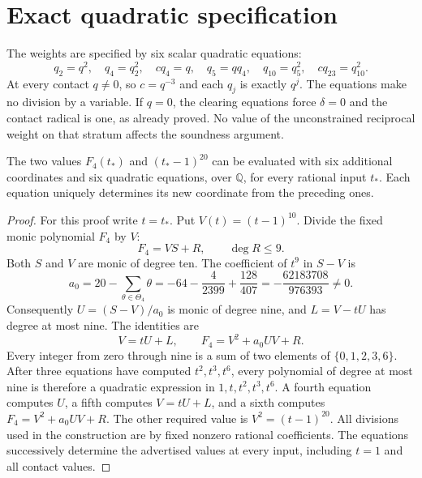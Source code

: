 \documentclass[11pt,a4paper]{article}
\newcommand{\Q}{\mathbb Q}\newcommand{\Z}{\mathbb Z}\newcommand{\HH}{\mathcal H}
\begin{document}
\section{Exact quadratic specification}
The weights are specified by six scalar quadratic equations:
\[
 q_2=q^2,\quad q_4=q_2^2,\quad c q_4=q,\quad
 q_5=qq_4,\quad q_{10}=q_5^2,\quad c q_{23}=q_{10}^2.
\]
At every contact $q\ne0$, so $c=q^{-3}$ and each $q_j$ is exactly
$q^j$. The equations make no division by a variable. If $q=0$, the
clearing equations force $\delta=0$ and the contact radical is one,
as already proved. No value of the unconstrained reciprocal weight
on that stratum affects the soundness argument.

\begin{lemma}\label{lem:contactcircuit}
The two values $F_4(t_*)$ and $(t_*-1)^{20}$ can be evaluated with
six additional coordinates and six quadratic equations, over $\Q$,
for every rational input $t_*$. Each equation uniquely determines its
new coordinate from the preceding ones.
\end{lemma}
\begin{proof}
For this proof write $t=t_*$. Put $V(t)=(t-1)^{10}$. Divide the fixed
monic polynomial $F_4$ by $V$:
\[
 F_4=VS+R,\qquad \deg R\le9.
\]
Both $S$ and $V$ are monic of degree ten. The coefficient of $t^9$
in $S-V$ is
\[
 a_0=20-\sum_{\theta\in\Theta_4}\theta
     =-64-\frac4{2399}+\frac{128}{407}
     =-\frac{62183708}{976393}\ne0.
\]
Consequently $U=(S-V)/a_0$ is monic of degree nine, and
$L=V-tU$ has degree at most nine. The identities are
\[
              V=tU+L,\qquad F_4=V^2+a_0UV+R.
\]
Every integer from zero through nine is a sum of two elements of
$\{0,1,2,3,6\}$. After three equations have computed
$t^2,t^3,t^6$, every polynomial of degree at most nine is therefore
a quadratic expression in $1,t,t^2,t^3,t^6$. A fourth equation
computes $U$, a fifth computes $V=tU+L$, and a sixth computes
$F_4=V^2+a_0UV+R$. The other required value is $V^2=(t-1)^{20}$.
All divisions used in the construction are by fixed nonzero rational
coefficients. The equations successively determine the advertised
values at every input, including $t=1$ and all contact values.
\end{proof}
\end{document}
